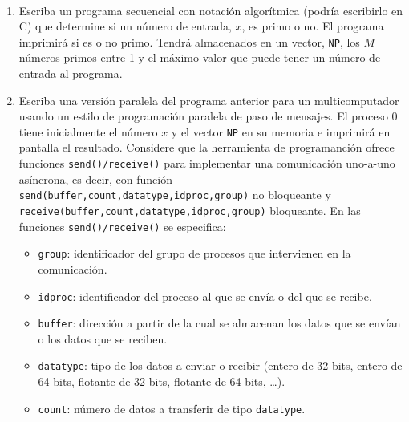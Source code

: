 \begin{ejercicio}\label{ej:2.11}~
    \begin{enumerate}
        \item Escriba un programa secuencial con notación algorítmica (podría escribirlo en C) que
        determine si un número de entrada, $x$, es primo o no. El programa imprimirá si es o no primo. Tendrá
        almacenados en un vector, \verb|NP|, los $M$ números primos entre 1 y el máximo valor que puede tener un número
        de entrada al programa.

        \item Escriba una versión paralela del programa anterior para un multicomputador usando un estilo de
        programación paralela de paso de mensajes. El proceso 0 tiene inicialmente el número $x$ y el vector \verb|NP| en su
        memoria e imprimirá en pantalla el resultado. Considere que la herramienta de programanción ofrece
        funciones \verb|send()/receive()| para implementar una comunicación uno-a-uno asíncrona, es decir, con función
        \verb|send(buffer,count,datatype,idproc,group)| no bloqueante y
        \verb|receive(buffer,count,datatype,idproc,group)| bloqueante. En las funciones \verb|send()/receive()| se
        especifica:
        \begin{itemize}
            \item \verb|group|: identificador del grupo de procesos que intervienen en la comunicación.
            \item \verb|idproc|: identificador del proceso al que se envía o del que se recibe.
            \item \verb|buffer|: dirección a partir de la cual se almacenan los datos que se envían o los datos que se
            reciben.
            \item \verb|datatype|: tipo de los datos a enviar o recibir (entero de 32 bits, entero de 64 bits, flotante de 32
            bits, flotante de 64 bits, \dots).
            \item \verb|count|: número de datos a transferir de tipo \verb|datatype|.
        \end{itemize}
    \end{enumerate}
\end{ejercicio}

